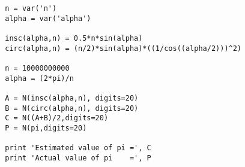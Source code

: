 \documentclass[letterpaper, 12pt]{amsart}
\theoremstyle{definition}  %
\begin{document}
	\begin{verbatim}
		n = var('n')
		alpha = var('alpha')

		insc(alpha,n) = 0.5*n*sin(alpha)
		circ(alpha,n) = (n/2)*sin(alpha)*((1/cos((alpha/2)))^2)

		n = 10000000000
		alpha = (2*pi)/n

		A = N(insc(alpha,n), digits=20)
		B = N(circ(alpha,n), digits=20)
		C = N((A+B)/2,digits=20)
		P = N(pi,digits=20)

		print 'Estimated value of pi =', C
		print 'Actual value of pi    =', P
	\end{verbatim}
\end{document}
